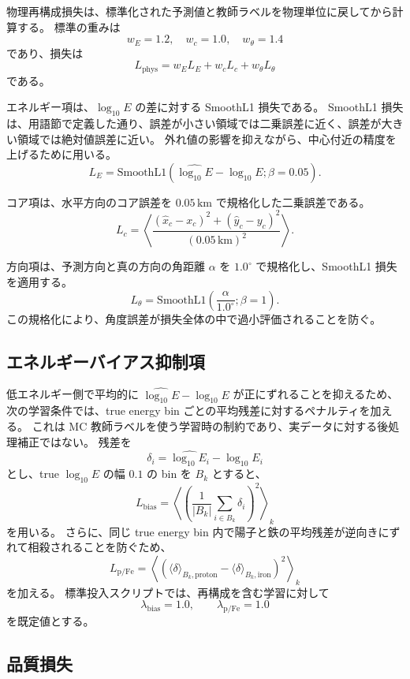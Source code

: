 \documentclass[lualatex,paper=a4,fontsize=9pt]{jlreq}
\begin{document}
物理再構成損失は、標準化された予測値と教師ラベルを物理単位に戻してから計算する。
標準の重みは
\[
  w_E=1.2,\quad w_c=1.0,\quad w_\theta=1.4
\]
であり、損失は
\[
  L_{\mathrm{phys}} =
  w_E L_E + w_c L_c + w_\theta L_\theta
\]
である。

エネルギー項は、$\log_{10}E$ の差に対する SmoothL1 損失である。
SmoothL1 損失は、用語節で定義した通り、誤差が小さい領域では二乗誤差に近く、誤差が大きい領域では絶対値誤差に近い。
外れ値の影響を抑えながら、中心付近の精度を上げるために用いる。
\[
  L_E=\mathrm{SmoothL1}(\widehat{\log_{10}E}-\log_{10}E;\beta=0.05).
\]

コア項は、水平方向のコア誤差を $0.05\,\mathrm{km}$ で規格化した二乗誤差である。
\[
  L_c=\left\langle
  \frac{(\hat{x}_c-x_c)^2+(\hat{y}_c-y_c)^2}{(0.05\,\mathrm{km})^2}
  \right\rangle.
\]

方向項は、予測方向と真の方向の角距離 $\alpha$ を $1.0^\circ$ で規格化し、SmoothL1 損失を適用する。
\[
  L_\theta=\mathrm{SmoothL1}\left(\frac{\alpha}{1.0^\circ};\beta=1\right).
\]
この規格化により、角度誤差が損失全体の中で過小評価されることを防ぐ。

\subsection{エネルギーバイアス抑制項}

低エネルギー側で平均的に $\widehat{\log_{10}E}-\log_{10}E$ が正にずれることを抑えるため、
次の学習条件では、true energy bin ごとの平均残差に対するペナルティを加える。
これは MC 教師ラベルを使う学習時の制約であり、実データに対する後処理補正ではない。
残差を
\[
  \delta_i=\widehat{\log_{10}E_i}-\log_{10}E_i
\]
とし、true $\log_{10}E$ の幅 $0.1$ の bin を $B_k$ とすると、
\[
  L_{\mathrm{bias}}=
  \left\langle
  \left(
  \frac{1}{|B_k|}\sum_{i\in B_k}\delta_i
  \right)^2
  \right\rangle_k
\]
を用いる。
さらに、同じ true energy bin 内で陽子と鉄の平均残差が逆向きにずれて相殺されることを防ぐため、
\[
  L_{\mathrm{p/Fe}}=
  \left\langle
  \left(
  \langle\delta\rangle_{B_k,\mathrm{proton}}
  -
  \langle\delta\rangle_{B_k,\mathrm{iron}}
  \right)^2
  \right\rangle_k
\]
を加える。
標準投入スクリプトでは、再構成を含む学習に対して
\[
  \lambda_{\mathrm{bias}}=1.0,\qquad
  \lambda_{\mathrm{p/Fe}}=1.0
\]
を既定値とする。

\subsection{品質損失}
\end{document}
